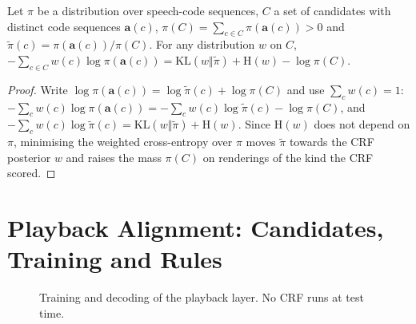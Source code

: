 \begin{proposition}
\label{prop:distill}
Let $\pi$ be a distribution over speech-code sequences, $C$ a set of candidates with distinct code sequences
$\bm{a}(c)$, $\pi(C)=\sum_{c\in C}\pi(\bm{a}(c))>0$ and $\tilde{\pi}(c)=\pi(\bm{a}(c))/\pi(C)$. For any distribution $w$
on $C$,
$-\sum_{c\in C}w(c)\log\pi(\bm{a}(c))=\mathrm{KL}(w\Vert\tilde{\pi})+\mathrm{H}(w)-\log\pi(C)$.
\end{proposition}

\begin{proof}
Write $\log\pi(\bm{a}(c))=\log\tilde{\pi}(c)+\log\pi(C)$ and use $\sum_cw(c)=1$:
$-\sum_cw(c)\log\pi(\bm{a}(c))=-\sum_cw(c)\log\tilde{\pi}(c)-\log\pi(C)$, and
$-\sum_cw(c)\log\tilde{\pi}(c)=\mathrm{KL}(w\Vert\tilde{\pi})+\mathrm{H}(w)$.
Since $\mathrm{H}(w)$ does not depend on $\pi$, minimising the weighted cross-entropy over $\pi$ moves $\tilde{\pi}$
towards the CRF posterior $w$ and raises the mass $\pi(C)$ on renderings of the kind the CRF scored.
\end{proof}

\section{Playback Alignment: Candidates, Training and Rules}
\label{app:plem}

\begin{figure}[h]
\small
{}
\caption{Training and decoding of the playback layer. No CRF runs at test time.}
\label{alg:pa}
\end{figure}

